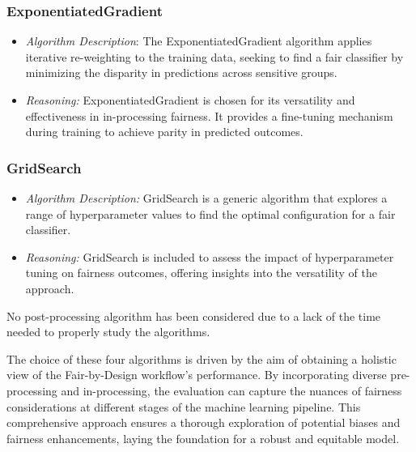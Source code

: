 \subsubsection{ExponentiatedGradient}

\begin{itemize}

    \item \emph{Algorithm Description}: The ExponentiatedGradient algorithm applies iterative re-weighting to the training data, seeking to find a fair classifier by minimizing the disparity in predictions across sensitive groups.

    \item \emph{Reasoning:} ExponentiatedGradient is chosen for its versatility and effectiveness in in-processing fairness. It provides a fine-tuning mechanism during training to achieve parity in predicted outcomes.

\end{itemize}

\subsubsection{GridSearch}

\begin{itemize}

    \item \emph{Algorithm Description:} GridSearch is a generic algorithm that explores a range of hyperparameter values to find the optimal configuration for a fair classifier.

    \item \emph{Reasoning:} GridSearch is included to assess the impact of hyperparameter tuning on fairness outcomes, offering insights into the versatility of the approach.

\end{itemize}

No post-processing algorithm has been considered due to a lack of the time needed to properly study the algorithms.

The choice of these four algorithms is driven by the aim of obtaining a holistic view of the Fair-by-Design workflow's performance. By incorporating diverse pre-processing and in-processing, the evaluation can capture the nuances of fairness considerations at different stages of the machine learning pipeline. This comprehensive approach ensures a thorough exploration of potential biases and fairness enhancements, laying the foundation for a robust and equitable model.

